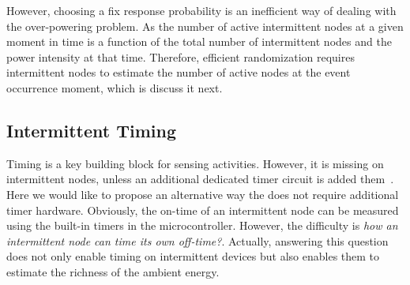 However, choosing a fix response probability is an inefficient way of dealing with the over-powering problem. As the number of active intermittent nodes at a given moment in time is a function of the total number of intermittent nodes and the power intensity at that time. Therefore, efficient randomization requires intermittent nodes to estimate the number of active nodes at the event occurrence moment, which is discuss it next.


\subsection{Intermittent Timing}

\label{subsec:interTimer}
Timing is a key building block for sensing activities. However, it is missing on intermittent nodes, unless an additional dedicated timer circuit is added them~\cite{hester2017timely}. Here we would like to propose an alternative way the does not require additional timer hardware. Obviously, the on-time of an intermittent node can be measured using the built-in timers in the microcontroller. However, the difficulty is \textit{how an intermittent node can time its own off-time?}. Actually, answering this question does not only enable timing on intermittent devices but also enables them to estimate the richness of the ambient energy. 

